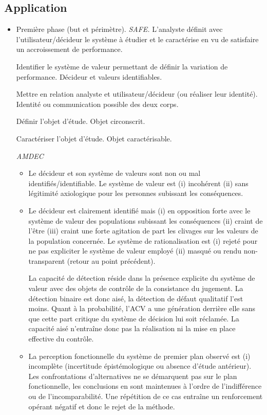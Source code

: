 \subsection{Application}
\begin{itemize}
\item Première phase (but et périmètre).
\textit{SAFE.}
L'analyste définit avec l'utilisateur/décideur le système à étudier et le caractérise en vu de satisfaire un accroissement de performance.

Identifier le système de valeur permettant de définir la variation de performance.
Décideur et valeurs identifiables.

Mettre en relation analyste et utilisateur/décideur (ou réaliser leur identité).
Identité ou communication possible des deux corps.

Définir l'objet d'étude.
Objet circonscrit.

Caractériser l'objet d'étude.
Objet caractérisable.

\textit{AMDEC}
\begin{itemize}
\item Le décideur et son système de valeurs sont non ou mal identifiés/identifiable.
Le système de valeur est (i) incohérent (ii) sans légitimité axiologique pour les personnes subissant les conséquences.
\item Le décideur est clairement identifié mais (i) en opposition forte avec le système de valeur des populations subissant les conséquences (ii) craint de l'être (iii) craint une forte agitation de part les clivages sur les valeurs de la population concernée.
Le système de rationalisation est (i) rejeté pour ne pas expliciter le système de valeur employé (ii) masqué ou rendu non-transparent (retour au point précédent).

La capacité de détection réside dans la présence explicite du système de valeur avec des objets de contrôle de la consistance du jugement.
La détection binaire est donc aisé, la détection de défaut qualitatif l'est moins.
Quant à la probabilité, l'ACV a une génération derrière elle sans que cette part critique du système de décision lui soit réclamée.
La capacité aisé n’entraîne donc pas la réalisation ni la mise en place effective du contrôle.

\item La perception fonctionnelle du système de premier plan observé est (i) incomplète (incertitude épistémologique ou absence d'étude antérieur).
Les confrontations d'alternatives ne se démarquent pas sur le plan fonctionnelle, les conclusions en sont maintenues à l'ordre de l’indifférence ou de l'incomparabilité.
Une répétition de ce cas entraîne un renforcement opérant négatif et donc le rejet de la méthode.


\end{itemize}
\end{itemize}

